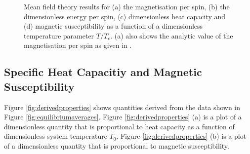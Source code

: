 \documentclass[11pt]{iopart}
\begin{document}
\begin{figure}[b]
        \quad
    \caption{Mean field theory results for (a) the magnetisation per spin, (b) the dimensionless energy per spin, (c) dimensionless heat capacity and (d) magnetic susceptibility as a function of a dimensionless temperature parameter $T/T_c$. (a) also shows the analytic value of the magnetisation per spin as given in \cite{handout}.}
    \label{fig:meanFieldResults}
\end{figure}

\subsection{Specific Heat Capacitiy and Magnetic Susceptibility}

Figure \ref{fig:derivedproperties} shows quantities derived from the data shown in Figure \ref{fig:equilibriumaverages}. Figure \ref{fig:derivedproperties} (a) is a plot of a dimensionless quantity that is proportional to heat capacity as a function of dimensionless system temperature $T_0$. Figure \ref{fig:derivedproperties} (b) is a plot of a dimensionless quantity that is proportional to magnetic susceptibility.
\end{document}
